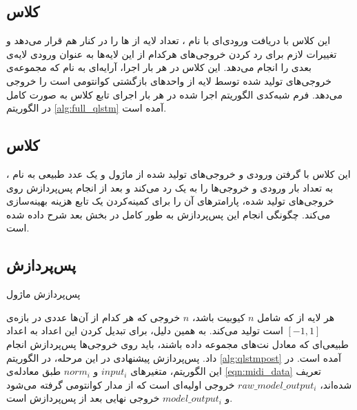 \subsection{
کلاس
}

این کلاس با دریافت ورودی‌ای با نام
،
تعداد
لایه از 
ها را در کنار هم قرار می‌دهد و تغییرات لازم برای رد کردن خروجی‌های هرکدام از این لایه‌ها به عنوان ورودی لایه‌ی بعدی را انجام می‌دهد. این کلاس در هر بار اجرا، آرایه‌ای به نام
که مجموعه‌ی خروجی‌های تولید شده توسط 
لایه از واحدهای بازگشتی کوانتومی است را خروجی می‌دهد.
فرم شبه‌کدی الگوریتم اجرا شده در هر بار اجرای تابع
کلاس 
به صورت کامل در الگوریتم
\ref{alg:full_qlstm}
آمده است.

\subsection{
کلاس
}
این کلاس با گرفتن ورودی و خروجی‌های تولید شده از ماژول
و یک عدد طبیعی به نام
،
به تعداد
بار
ورودی و خروجی‌ها را به یک 
رد می‌کند و بعد از انجام پس‌پردازش روی خروجی‌های تولید شده، پارامترهای آن را برای کمینه‌کردن یک تابع هزینه بهینه‌سازی می‌کند. چگونگی انجام این پس‌پردازش به طور کامل در بخش بعد شرح داده شده است.

\subsection{پس‌پردازش} \label{sec:qlstm_post}
\begin{algorithm}[t]
\caption{پس‌پردازش ماژول }  \label{alg:qlstmpost}
\end{algorithm}
هر لایه از
که شامل
$n$
کیوبیت باشد، 
$n$
خروجی که هر کدام از آن‌ها عددی در بازه‌ی
$[-1, 1]$
است تولید می‌کند. به همین دلیل، برای تبدیل کردن این اعداد به اعداد طبیعی‌ای که معادل نت‌های مجموعه داده باشند، باید روی خروجی‌ها پس‌پردازش انجام داد.
پس‌پردازش پیشنهادی در این مرحله، در الگوریتم
\ref{alg:qlstmpost}
آمده است. در این الگوریتم، متغیرهای
$input_i$
و
$norm_i$
طبق معادله‌ی
\ref{eqn:midi_data}
تعریف شده‌اند،
$raw\_model\_output_i$
خروجی اولیه‌ای است که از مدار کوانتومی گرفته می‌شود و
$model\_output_i$
خروجی نهایی بعد از پس‌پردازش است.



